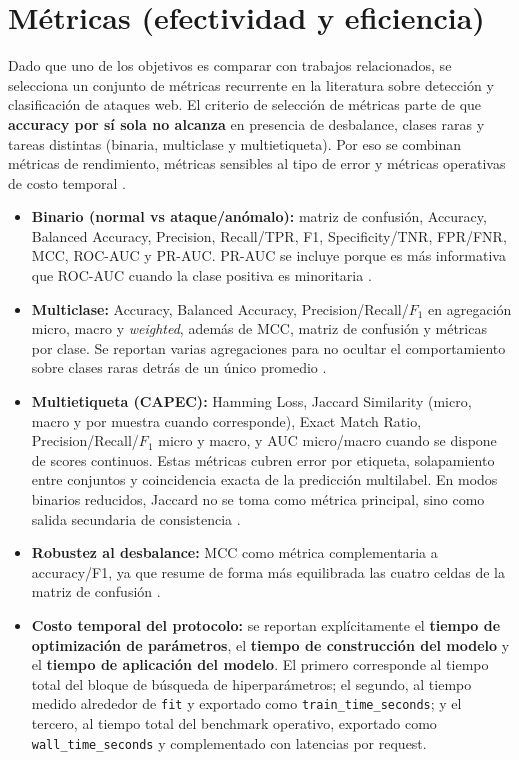 \documentclass[12pt,oneside]{report}
\begin{document}
\section{Métricas (efectividad y eficiencia)}
Dado que uno de los objetivos es comparar con trabajos relacionados, se selecciona un conjunto de métricas recurrente en la literatura sobre detección y clasificación de ataques web. El criterio de selección de métricas parte de que \textbf{accuracy por sí sola no alcanza} en presencia de desbalance, clases raras y tareas distintas (binaria, multiclase y multietiqueta). Por eso se combinan métricas de rendimiento, métricas sensibles al tipo de error y métricas operativas de costo temporal \cite{saito_pr_auc,chicco_mcc,srbh_paper,tsoumakas_multilabel_overview}.

\begin{itemize}[leftmargin=*]
  \item \textbf{Binario (normal vs ataque/anómalo):} matriz de confusión, Accuracy, Balanced Accuracy, Precision, Recall/TPR, F1, Specificity/TNR, FPR/FNR, MCC, ROC-AUC y PR-AUC. PR-AUC se incluye porque es más informativa que ROC-AUC cuando la clase positiva es minoritaria \cite{saito_pr_auc}.
  \item \textbf{Multiclase:} Accuracy, Balanced Accuracy, Precision/Recall/$F_1$ en agregación micro, macro y \textit{weighted}, además de MCC, matriz de confusión y métricas por clase. Se reportan varias agregaciones para no ocultar el comportamiento sobre clases raras detrás de un único promedio \cite{tsoumakas_multilabel_overview,zhou_2024}.
  \item \textbf{Multietiqueta (CAPEC):} Hamming Loss, Jaccard Similarity (micro, macro y por muestra cuando corresponde), Exact Match Ratio, Precision/Recall/$F_1$ micro y macro, y AUC micro/macro cuando se dispone de scores continuos. Estas métricas cubren error por etiqueta, solapamiento entre conjuntos y coincidencia exacta de la predicción multilabel. En modos binarios reducidos, Jaccard no se toma como métrica principal, sino como salida secundaria de consistencia \cite{srbh_paper,tsoumakas_multilabel_overview}.
  \item \textbf{Robustez al desbalance:} MCC como métrica complementaria a accuracy/F1, ya que resume de forma más equilibrada las cuatro celdas de la matriz de confusión \cite{chicco_mcc}.
  \item \textbf{Costo temporal del protocolo:} se reportan explícitamente el \textbf{tiempo de optimización de parámetros}, el \textbf{tiempo de construcción del modelo} y el \textbf{tiempo de aplicación del modelo}. El primero corresponde al tiempo total del bloque de búsqueda de hiperparámetros; el segundo, al tiempo medido alrededor de \texttt{fit} y exportado como \texttt{train\_time\_seconds}; y el tercero, al tiempo total del benchmark operativo, exportado como \texttt{wall\_time\_seconds} y complementado con latencias por request.

\end{itemize}
\end{document}
